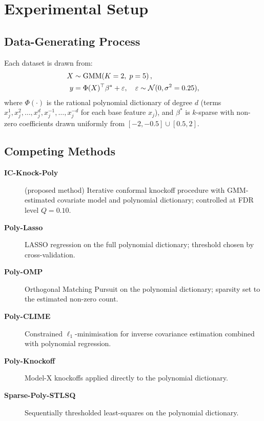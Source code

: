 \documentclass[12pt,a4paper]{article}
\begin{document}
\section{Experimental Setup}
\label{sec:setup}

\subsection{Data-Generating Process}

Each dataset is drawn from:
\begin{align}
  X       &\sim \mathrm{GMM}\!\left(K=2,\; p=5\right), \notag\\
  y       &= \Phi(X)^\top \beta^* + \varepsilon, \quad
             \varepsilon \sim \mathcal{N}(0, \sigma^2 = 0.25),\notag
\end{align}
where \(\Phi(\cdot)\) is the rational polynomial dictionary of degree \(d\)
(terms \(x_j^1, x_j^2, \ldots, x_j^d, x_j^{-1}, \ldots, x_j^{-d}\) for
each base feature \(x_j\)), and \(\beta^*\) is \(k\)-sparse with non-zero
coefficients drawn uniformly from \([-2,-0.5]\cup[0.5,2]\).

\subsection{Competing Methods}

\begin{description}
  \item[\textbf{IC-Knock-Poly}] (proposed method)
    Iterative conformal knockoff procedure with GMM-estimated covariate
    model and polynomial dictionary; controlled at FDR level \(Q=0.10\).
  \item[\textbf{Poly-Lasso}]
    LASSO regression on the full polynomial dictionary; threshold chosen
    by cross-validation.
  \item[\textbf{Poly-OMP}]
    Orthogonal Matching Pursuit on the polynomial dictionary; sparsity
    set to the estimated non-zero count.
  \item[\textbf{Poly-CLIME}]
    Constrained \(\ell_1\)-minimisation for inverse covariance estimation
    combined with polynomial regression.
  \item[\textbf{Poly-Knockoff}]
    Model-X knockoffs applied directly to the polynomial dictionary.
  \item[\textbf{Sparse-Poly-STLSQ}]
    Sequentially thresholded least-squares on the polynomial dictionary.
\end{description}
\end{document}
